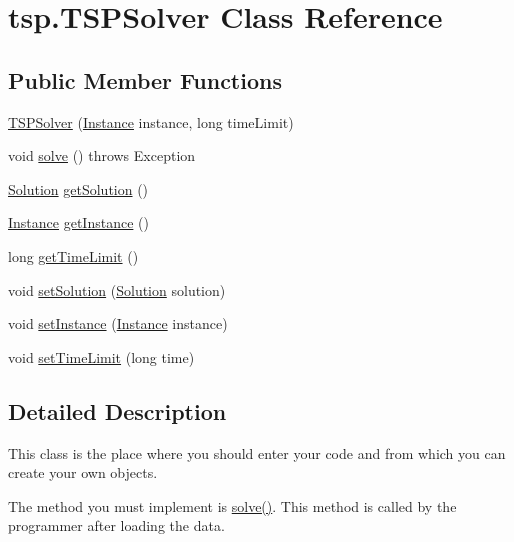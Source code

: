 \hypertarget{classtsp_1_1_t_s_p_solver}{}\section{tsp.\+T\+S\+P\+Solver Class Reference}
\label{classtsp_1_1_t_s_p_solver}
\subsection*{Public Member Functions}
\begin{DoxyCompactItemize}
\item 
\mbox{\hyperlink{classtsp_1_1_t_s_p_solver_a0f6712f49bdce5b161b1bfd9f1112e91}{T\+S\+P\+Solver}} (\mbox{\hyperlink{classtsp_1_1_instance}{Instance}} instance, long time\+Limit)
\item 
void \mbox{\hyperlink{classtsp_1_1_t_s_p_solver_a9d4e4f4559a537b2af395fb8ab930906}{solve}} ()  throws Exception 	
\item 
\mbox{\hyperlink{classtsp_1_1_solution}{Solution}} \mbox{\hyperlink{classtsp_1_1_t_s_p_solver_a036aa2d65bd855929ff84886cb01f004}{get\+Solution}} ()
\item 
\mbox{\hyperlink{classtsp_1_1_instance}{Instance}} \mbox{\hyperlink{classtsp_1_1_t_s_p_solver_a981fdbf2b80722b258d99be5c22a2fab}{get\+Instance}} ()
\item 
long \mbox{\hyperlink{classtsp_1_1_t_s_p_solver_afa2c693c928addd2bee76ad2a4aed108}{get\+Time\+Limit}} ()
\item 
void \mbox{\hyperlink{classtsp_1_1_t_s_p_solver_af58c18bddbdd6d8fb67a8d1335913f14}{set\+Solution}} (\mbox{\hyperlink{classtsp_1_1_solution}{Solution}} solution)
\item 
void \mbox{\hyperlink{classtsp_1_1_t_s_p_solver_a962cd00f504347f89a69b2142dc9a400}{set\+Instance}} (\mbox{\hyperlink{classtsp_1_1_instance}{Instance}} instance)
\item 
void \mbox{\hyperlink{classtsp_1_1_t_s_p_solver_a13dec1ff9423995aa911859122b416a9}{set\+Time\+Limit}} (long time)
\end{DoxyCompactItemize}


\subsection{Detailed Description}
This class is the place where you should enter your code and from which you can create your own objects.

The method you must implement is \mbox{\hyperlink{classtsp_1_1_t_s_p_solver_a9d4e4f4559a537b2af395fb8ab930906}{solve()}}. This method is called by the programmer after loading the data.

